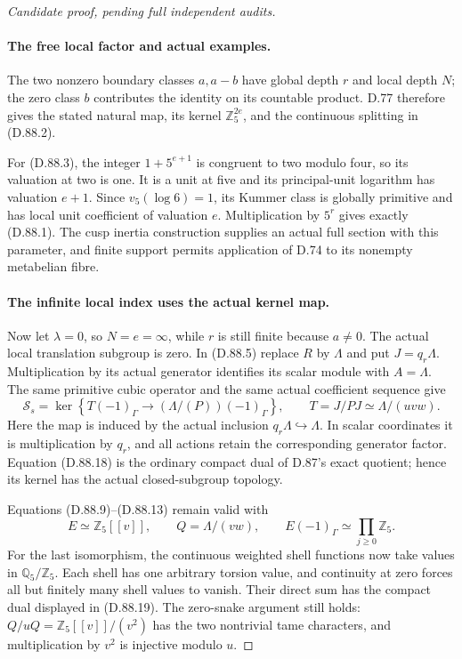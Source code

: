 \begin{proof}[Candidate proof, pending full independent audits]
\paragraph{The free local factor and actual examples.}
The two nonzero boundary classes \(a,a-b\) have global
depth \(r\) and local depth \(N\); the zero class \(b\)
contributes the identity on its countable product. D.77 therefore
gives the stated natural map, its kernel \(\mathbb Z_5^{2e}\),
and the continuous splitting in (D.88.2).

For (D.88.3), the integer \(1+5^{e+1}\) is congruent to two
modulo four, so its valuation at two is one. It is a unit at
five and its principal-unit logarithm has valuation \(e+1\).
Since \(v_5(\log6)=1\), its Kummer class is globally primitive
and has local unit coefficient of valuation \(e\).
Multiplication by \(5^r\) gives exactly (D.88.1).
The cusp inertia construction supplies an actual full section
with this parameter, and finite support permits application
of D.74 to its nonempty metabelian fibre.

\paragraph{The infinite local index uses the actual kernel map.}
Now let \(\lambda=0\), so \(N=e=\infty\), while \(r\)
is still finite because \(a\ne0\). The actual local translation
subgroup is zero. In (D.88.5) replace \(R\) by \(\Lambda\)
and put \(J=q_r\Lambda\). Multiplication by its actual
generator identifies its scalar module with \(A=\Lambda\).
The same primitive cubic operator and the same actual coefficient
sequence give
\[
 \mathcal S_s=\ker\left\{
      T(-1)_\Gamma\longrightarrow(\Lambda/(P))(-1)_\Gamma
                         \right\},\qquad
 T=J/PJ\simeq\Lambda/(uvw).                            \tag{D.88.18}
\]
Here the map is induced by the actual inclusion
\(q_r\Lambda\hookrightarrow\Lambda\). In scalar coordinates
it is multiplication by \(q_r\), and all actions retain the
corresponding generator factor. Equation (D.88.18) is the
ordinary compact dual of D.87's exact quotient; hence its kernel
has the actual closed-subgroup topology.

Equations (D.88.9)--(D.88.13) remain valid with
\[
 E\simeq\mathbb Z_5[[v]],\qquad Q=\Lambda/(vw),
                    \qquad E(-1)_\Gamma\simeq\prod_{j\ge0}\mathbb Z_5.
                                                               \tag{D.88.19}
\]
For the last isomorphism, the continuous weighted shell functions
now take values in \(\mathbb Q_5/\mathbb Z_5\). Each shell
has one arbitrary torsion value, and continuity at zero forces
all but finitely many shell values to vanish. Their direct sum
has the compact dual displayed in (D.88.19). The zero-snake
argument still holds: \(Q/uQ=\mathbb Z_5[[v]]/(v^2)\)
has the two nontrivial tame characters, and multiplication by
\(v^2\) is injective modulo \(u\).


\end{proof}
